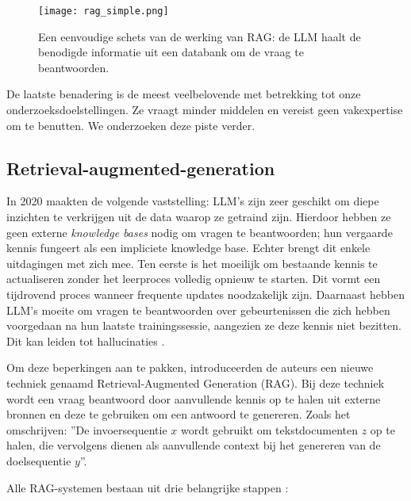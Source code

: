 \begin{figure}
    \centering
    \texttt{[image: rag\_simple.png]}
    \caption[Schets van RAG]{\label{fig:rag_simple}Een eenvoudige schets van de werking van \acrshort{RAG}: de \acrshort{LLM} haalt de benodigde informatie uit een databank om de vraag te beantwoorden.}
\end{figure}

De laatste benadering is de meest veelbelovende met betrekking tot onze onderzoeksdoelstellingen. Ze vraagt minder middelen en vereist geen vakexpertise om te benutten. We onderzoeken deze piste verder.

\subsection{Retrieval-augmented-generation}%
\label{subsec:rag}

In 2020 maakten \textcite{Lewis2020} de volgende vaststelling: LLM's zijn zeer geschikt om diepe inzichten te verkrijgen uit de data waarop ze getraind zijn. Hierdoor hebben ze geen externe \textit{knowledge bases} nodig om vragen te beantwoorden; hun vergaarde kennis fungeert als een impliciete knowledge base. Echter brengt dit enkele uitdagingen met zich mee. Ten eerste is het moeilijk om bestaande kennis te actualiseren zonder het leerproces volledig opnieuw te starten. Dit vormt een tijdrovend proces wanneer frequente updates noodzakelijk zijn. Daarnaast hebben LLM's moeite om vragen te beantwoorden over gebeurtenissen die zich hebben voorgedaan na hun laatste trainingssessie, aangezien ze deze kennis niet bezitten. Dit kan leiden tot hallucinaties \autocite{Gao2023}.

Om deze beperkingen aan te pakken, introduceerden de auteurs een nieuwe techniek genaamd Retrieval-Augmented Generation (RAG). Bij deze techniek wordt een vraag beantwoord door aanvullende kennis op te halen uit externe bronnen en deze te gebruiken om een antwoord te genereren. Zoals \textcite{Lewis2020} het omschrijven: ''De invoersequentie $x$ wordt gebruikt om tekstdocumenten $z$ op te halen, die vervolgens dienen als aanvullende context bij het genereren van de doelsequentie $y$''.

Alle RAG-systemen bestaan uit drie belangrijke stappen \autocite{Gao2023}:  

